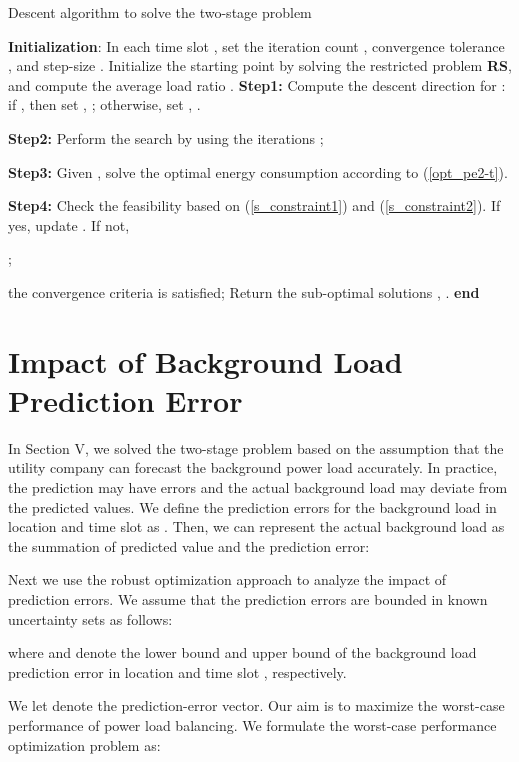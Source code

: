\documentclass[journal]{IEEEtran}
\begin{document}
	\begin{algorithm}[h]
		\caption{Descent algorithm to solve the two-stage problem}
		\label{alg1}
		\begin{algorithmic}[1]
			\State \textbf{Initialization}: In each time slot , set the iteration count , convergence tolerance , and step-size . Initialize the starting point  by solving the restricted problem \textbf{RS}, and compute the average load ratio . 
			\Repeat
			\State \textbf{Step1:} Compute the descent direction  for : if , then set , ; otherwise, set , .
			
			\State \textbf{Step2:} Perform the search by using the iterations
			\State ;
			
			\State \textbf{Step3:} Given , solve the optimal energy consumption  according to (\ref{opt_pe2-t}).
			
			\State \textbf{Step4:} Check the feasibility based on (\ref{s_constraint1}) and (\ref{s_constraint2}). If yes, update . 
			If not, 
			
			
			\State ;
			
			\Until the convergence criteria  is satisfied;
			\State Return the sub-optimal solutions , .
			\State \textbf{end}
		\end{algorithmic}
	\end{algorithm}
	
	
	\section{Impact of Background Load Prediction Error}
	In Section V, we solved the two-stage problem based on the assumption that the utility company can forecast the background power load  accurately. In practice, the prediction may have errors and the actual background load may deviate from the predicted values. We define the prediction errors for the background load in location  and time slot  as . Then, we can represent the actual background load  as the summation of predicted value and the prediction error:
	
	
	Next we use the robust optimization approach \cite{worst-case} to analyze the impact of prediction errors. We assume that the prediction errors are bounded in known uncertainty sets as follows:
	
	where  and  denote the lower bound and upper bound of the background load prediction error in location  and time slot , respectively.
	
	We let  denote the prediction-error vector. Our aim is to maximize the worst-case performance of power load balancing. We formulate the worst-case performance optimization problem as:
	
\end{document}
